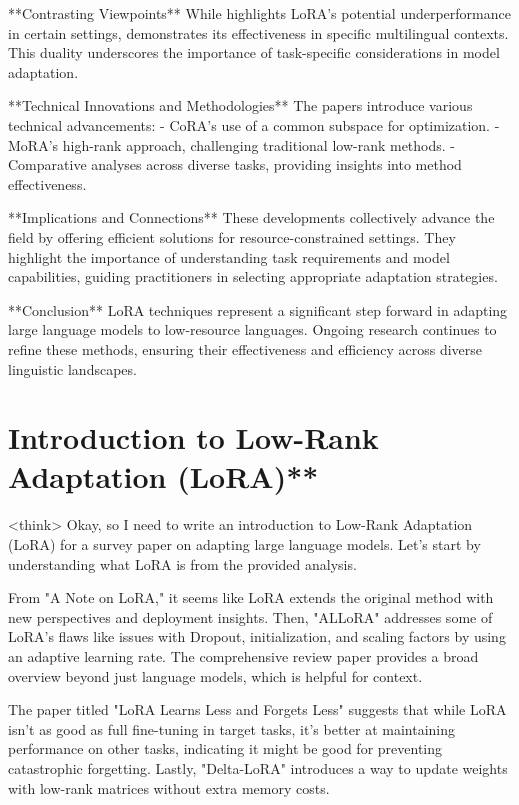 \documentclass[conference]{IEEEtran}
\begin{document}
**Contrasting Viewpoints**
While \cite{b4} highlights LoRA's potential underperformance in certain settings, \cite{b5} demonstrates its effectiveness in specific multilingual contexts. This duality underscores the importance of task-specific considerations in model adaptation.

**Technical Innovations and Methodologies**
The papers introduce various technical advancements:
- CoRA's use of a common subspace for optimization.
- MoRA's high-rank approach, challenging traditional low-rank methods.
- Comparative analyses across diverse tasks, providing insights into method effectiveness.

**Implications and Connections**
These developments collectively advance the field by offering efficient solutions for resource-constrained settings. They highlight the importance of understanding task requirements and model capabilities, guiding practitioners in selecting appropriate adaptation strategies.

**Conclusion**
LoRA techniques represent a significant step forward in adapting large language models to low-resource languages. Ongoing research continues to refine these methods, ensuring their effectiveness and efficiency across diverse linguistic landscapes.

\section{Introduction to Low-Rank Adaptation (LoRA)**}
<think>
Okay, so I need to write an introduction to Low-Rank Adaptation (LoRA) for a survey paper on adapting large language models. Let's start by understanding what LoRA is from the provided analysis.

From "A Note on LoRA," it seems like LoRA extends the original method with new perspectives and deployment insights. Then, "ALLoRA" addresses some of LoRA's flaws like issues with Dropout, initialization, and scaling factors by using an adaptive learning rate. The comprehensive review paper provides a broad overview beyond just language models, which is helpful for context.

The paper titled "LoRA Learns Less and Forgets Less" suggests that while LoRA isn't as good as full fine-tuning in target tasks, it's better at maintaining performance on other tasks, indicating it might be good for preventing catastrophic forgetting. Lastly, "Delta-LoRA" introduces a way to update weights with low-rank matrices without extra memory costs.
\end{document}
